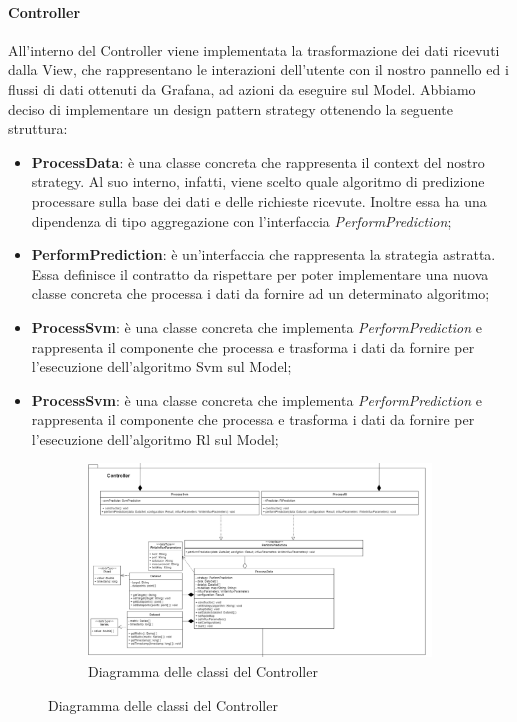 \paragraph{Controller} \mbox{}
All'interno del Controller viene implementata la trasformazione dei dati ricevuti dalla View, che rappresentano le interazioni dell'utente con il nostro pannello ed i flussi di dati ottenuti da Grafana\glo, ad azioni da eseguire sul Model.
Abbiamo deciso di implementare un design pattern strategy ottenendo la seguente struttura:
\begin{itemize}
	\item \textbf{ProcessData}: è una classe concreta che rappresenta il context del nostro strategy. Al suo interno, infatti, viene scelto quale algoritmo di predizione processare sulla base dei dati e delle richieste ricevute. Inoltre essa ha una dipendenza di tipo aggregazione con l'interfaccia \textit{PerformPrediction};
	\item \textbf{PerformPrediction}: è un'interfaccia che rappresenta la strategia astratta. Essa definisce il contratto da rispettare per poter implementare una nuova classe concreta che processa i dati da fornire ad un determinato algoritmo;
	\item \textbf{ProcessSvm}: è una classe concreta che implementa \textit{PerformPrediction} e rappresenta il componente che processa e trasforma i dati da fornire per l'esecuzione dell'algoritmo Svm sul Model;
	\item \textbf{ProcessSvm}: è una classe concreta che implementa \textit{PerformPrediction} e rappresenta il componente che processa e trasforma i dati da fornire per l'esecuzione dell'algoritmo Rl sul Model;
\end{itemize}
\mbox{}
\begin{landscape}
	\begin{figure}
		\begin{figure} [H]
			\includegraphics[width=\linewidth]{./img/Diagrammi/controller-plug-in.png}
			\caption{Diagramma delle classi del Controller}
		\end{figure}
	\end{figure}
\end{landscape}
